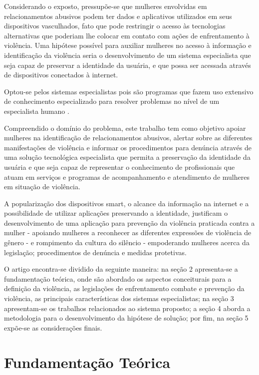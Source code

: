 \documentclass[12pt]{article}
\begin{document}
Considerando o exposto, pressupõe-se que mulheres envolvidas em relacionamentos abusivos podem ter dados e aplicativos utilizados em seus dispositivos vasculhados, fato que pode restringir o acesso às tecnologias alternativas que poderiam lhe colocar em contato com ações de enfrentamento à violência. Uma hipótese possível para auxiliar mulheres no acesso à informação e  identificação da violência seria o desenvolvimento de um sistema especialista que seja capaz de preservar a identidade da usuária, e que possa ser acessada através de dispositivos conectados à internet.
 
Optou-se pelos sistemas especialistas pois são programas que fazem uso extensivo de conhecimento especializado para resolver problemas no nível de um especialista humano \cite{Giarratano}.

Compreendido o domínio do problema, este trabalho tem como objetivo apoiar mulheres na identificação de relacionamentos abusivos, alertar sobre as diferentes manifestações de violência e informar os procedimentos para denúncia através de uma solução tecnológica especialista que permita a preservação da identidade da usuária e que seja capaz de representar o conhecimento de profissionais que atuam em serviços e programas de acompanhamento e atendimento de mulheres em situação de violência.

A popularização dos dispositivos smart, o alcance da informação na internet e a possibilidade de utilizar aplicações preservando a identidade, justificam o desenvolvimento de uma aplicação para prevenção da violência praticada contra a mulher - apoiando mulheres a reconhecer as diferentes expressões de violência de  gênero - e  rompimento da cultura do silêncio - empoderando mulheres acerca da legislação; procedimentos de denúncia e medidas protetivas.

O artigo encontra-se dividido da seguinte maneira: na seção 2 apresenta-se a fundamentação teórica, onde são abordado os aspectos conceiturais para a definição da violência, as legislações de enfrentamento combate e prevenção da violência, as principais características dos sistemas especialistas; na seção 3 apresentam-se os trabalhos relacionados ao sistema proposto; a seção 4 aborda a metodologia para o desenvolvimento da hipótese de solução; por fim, na seção 5 expõe-se as considerações finais.

\section {Fundamentação Teórica }
 
\end{document}
